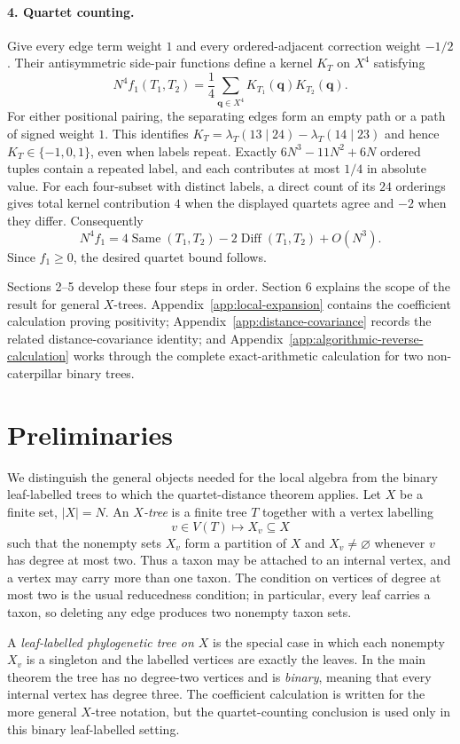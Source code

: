 \documentclass[11pt]{article}
\newcommand{\Same}{\operatorname{Same}}
\newcommand{\Diff}{\operatorname{Diff}}
\begin{document}
\paragraph{4. Quartet counting.}
Give every edge term weight $1$ and every ordered-adjacent correction weight
$-1/2$.  Their antisymmetric side-pair functions define a kernel $K_T$ on
$X^4$ satisfying
\[
 N^4f_1(T_1,T_2)=\frac14\sum_{\boldsymbol q\in X^4}
 K_{T_1}(\boldsymbol q)K_{T_2}(\boldsymbol q).
\]
For either positional pairing, the separating edges form an empty path or a
path of signed weight $1$.  This identifies
$K_T=\lambda_T(13\mid24)-\lambda_T(14\mid23)$ and hence
$K_T\in\{-1,0,1\}$, even when labels repeat.  Exactly
$6N^3-11N^2+6N$ ordered tuples contain a repeated label, and each contributes
at most $1/4$ in absolute value.  For each four-subset with distinct labels,
a direct count of its $24$ orderings gives total kernel contribution $4$ when
the displayed quartets agree and $-2$ when they differ.  Consequently
\[
 N^4f_1=4\Same(T_1,T_2)-2\Diff(T_1,T_2)+O(N^3).
\]
Since $f_1\ge0$, the desired quartet bound follows.

Sections 2--5 develop these four steps in order.  Section 6 explains the
scope of the result for general $X$-trees.  Appendix~\ref{app:local-expansion}
contains the coefficient calculation proving positivity;
Appendix~\ref{app:distance-covariance} records the related distance-covariance
identity; and Appendix~\ref{app:algorithmic-reverse-calculation} works through
the complete exact-arithmetic calculation for two non-caterpillar binary
trees.

\section{Preliminaries}

We distinguish the general objects needed for the local algebra from the
binary leaf-labelled trees to which the quartet-distance theorem applies.
Let $X$ be a finite set, $|X|=N$.  An \emph{$X$-tree} is a finite tree $T$
together with a vertex labelling
\[
v\in V(T)\longmapsto X_v\subseteq X
\]
such that the nonempty sets $X_v$ form a partition of $X$ and
$X_v\ne\varnothing$ whenever $v$ has degree at most two.  Thus a taxon may be
attached to an internal vertex, and a vertex may carry more than one taxon.
The condition on vertices of degree at most two is the usual reducedness
condition; in particular, every leaf carries a taxon, so deleting any edge
produces two nonempty taxon sets.

A \emph{leaf-labelled phylogenetic tree on $X$} is the special case in which
each nonempty $X_v$ is a singleton and the labelled vertices are exactly the
leaves.  In the main theorem the tree has no degree-two vertices and is
\emph{binary}, meaning that every internal vertex has degree three.  The
coefficient calculation is written for the more general $X$-tree notation,
but the quartet-counting conclusion is used only in this binary
leaf-labelled setting.
\end{document}
